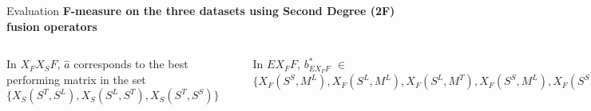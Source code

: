 \documentclass[10pt,xcolor=table]{beamer}
\newcommand\mlex{M^{\scriptscriptstyle L}}
\newcommand\mstd{M^{\scriptscriptstyle T}}
\newcommand\slex{S^{\scriptscriptstyle L}}
\newcommand\ssyn{S^{\scriptscriptstyle S}}
\newcommand\sstd{S^{\scriptscriptstyle T}}
\begin{document}
\begin{frame}[t]{Evaluation}
\textbf{F-measure on the three datasets using Second Degree (2F)  fusion operators}
\vspace{.3cm}
\begin{columns}
 \small In $X_FX_SF$, $\hat{a}$ corresponds to the best performing matrix in the set $\{ X_S(\sstd, \slex),X_S(\slex, \sstd), \allowbreak X_S(\sstd, \ssyn)\}$
\begin{minipage}[c][0.5\textheight][c]{\linewidth}
\includegraphics[width=1\linewidth]{image2/Chapitre4/2F_1.png}
\end{minipage}
In $EX_FF$, $b^*_{\scriptscriptstyle EX_FF}$  $\in$ $\{X_F(\ssyn, \mlex), \allowbreak X_F(\slex, \mlex), X_F(\slex, \mstd), \allowbreak X_F(\ssyn, \mlex), X_F(\ssyn, \mstd) \}$
\begin{minipage}[c][0.5\textheight][c]{\linewidth}
\includegraphics[width=1\linewidth]{image2/Chapitre4/2F_2.png}
\end{minipage}
\end{columns}

\vspace{\textheight}
\end{frame}
\end{document}
